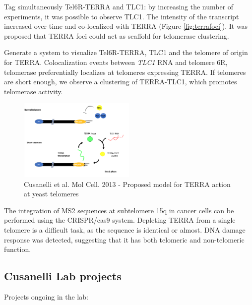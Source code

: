 Tag simultaneously Tel6R-TERRA and TLC1: by increasing the number of
experiments, it was possible to observe TLC1. The intensity of the
transcript increased over time and co-localized with TERRA (Figure \ref{fig:terrafoci}). It was proposed that TERRA foci could act as scaffold for
telomerase clustering.

Generate a system to visualize Tel6R-TERRA, TLC1 and the telomere of
origin for TERRA. Colocalization events between \emph{TLC1} RNA and
telomere 6R, telomerase preferentially localizes at telomeres expressing
TERRA.  If telomeres are short enough, we observe a clustering of
TERRA-TLC1, which promotes telomerase activity.

\begin{figure}
\centering
\includegraphics[width=0.5\textwidth]{../_resources/Screen_Shot_2022-12-17_at_11-08-23.png}
\caption{Cusanelli et al. Mol Cell. 2013 - Proposed model for TERRA action at yeast telomeres}
\end{figure}

The integration of MS2 sequences at subtelomere 15q in cancer cells can
be performed using the CRISPR/cas9 system. Depleting TERRA from a single
telomere is a difficult task, as the sequence is identical or almost. DNA
damage response was detected, suggesting that it has both telomeric and
non-telomeric function.

\hypertarget{cusanelli-lab-projects}{%
\subsection{Cusanelli Lab projects}\label{cusanelli-lab-projects}}

Projects ongoing in the lab:

